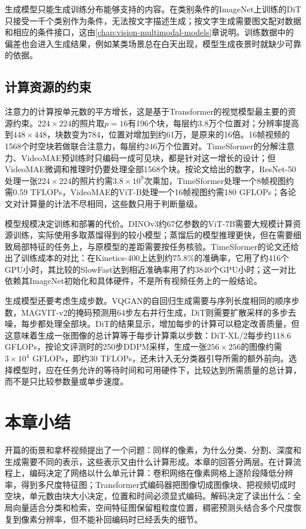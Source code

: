 生成模型只能生成训练分布能够支持的内容。在类别条件的ImageNet上训练的DiT只接受一千个类别作为条件，无法按文字描述生成；按文字生成需要图文配对数据和相应的条件接口，这由\ref{chap:vision-multimodal-models}章说明。训练数据中的偏差也会进入生成结果，例如某类场景总在白天出现，模型生成夜景时就缺少可靠的依据。

\subsection{计算资源的约束}
\label{sec:vision-ivm-compute}

注意力的计算按单元数的平方增长，这是基于Transformer的视觉模型最主要的资源约束。$224\times224$的照片取$p=16$有196个块，每层约3.8万个位置对；分辨率提高到$448\times448$，块数变为784，位置对增加到约61万，是原来的16倍。16帧视频的1568个时空块若做联合注意力，每层约246万个位置对。TimeSformer的分解注意力、VideoMAE预训练时只编码一成可见块，都是针对这一增长的设计；但VideoMAE微调和推理时仍要处理全部1568个块。按论文给出的数字，ResNet-50处理一张$224\times224$的照片约需$3.8\times10^9$次乘加，TimeSformer处理一个8帧视图约需0.59 TFLOPs，VideoMAE的ViT-B处理一个16帧视图约需180 GFLOPs；各论文对计算量的计法不尽相同，这些数只用于判断量级。

模型规模决定训练和部署的代价。DINOv3约67亿参数的ViT-7B需要大规模计算资源训练，实际使用多取蒸馏得到的较小模型；蒸馏后的模型推理更快，但在需要细致局部特征的任务上，与原模型的差距需要按任务核验。TimeSformer的论文还给出了训练成本的对比：在Kinetics-400上达到约75.8\%的准确率，它用了约416个GPU小时，其比较的SlowFast达到相近准确率用了约3840个GPU小时；这一对比依赖其ImageNet初始化和具体硬件，不是所有视频任务上的一般结论。

生成模型还要考虑生成步数。VQGAN的自回归生成需要与序列长度相同的顺序步数，MAGVIT-v2的掩码预测用64步左右并行生成，DiT则需要扩散采样的多步去噪，每步都处理全部块。DiT的结果显示，增加每步的计算可以稳定改善质量，但这意味着生成一张图像的总计算等于每步计算乘以步数：DiT-XL/2每步约118.6 GFLOPs，按论文评测时的250步DDPM采样，生成一张$256\times256$的图像约需$3\times10^4$ GFLOPs，即约30 TFLOPs，还未计入无分类器引导所需的额外前向。选择模型时，应在任务允许的等待时间和可用硬件下，比较达到所需质量的总计算，而不是只比较参数量或单步速度。

\section{本章小结}
\label{sec:vision-ivm-summary}

开篇的街景和拿杯视频提出了一个问题：同样的像素，为什么分类、分割、深度和生成需要不同的表示，这些表示又由什么计算形成。本章的回答分两层。在计算流程上，编码决定了网络以什么单元计算：卷积网络在像素网格上逐阶段降低分辨率，得到多尺度特征图；Transformer式编码器把图像切成图像块、把视频切成时空块，单元数由块大小决定，位置和时间必须显式编码。解码决定了读出什么：全局向量适合分类和检索，空间特征图保留粗粒度位置，稠密预测头结合多个尺度恢复到像素分辨率，但不能补回编码时已经丢失的细节。

